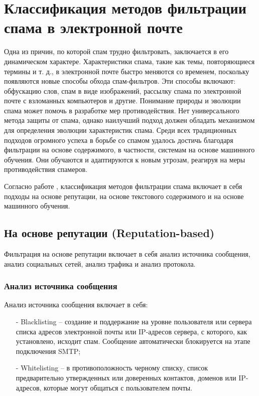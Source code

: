 \section{Классификация методов фильтрации спама в электронной почте}\label{Section:Filtering}

Одна из причин, по которой спам трудно фильтровать, заключается в
его динамическом характере. Характеристики спама, такие как темы,
повторяющиеся термины и т. д., в электронной почте быстро меняются
со временем, поскольку появляются новые способы обхода спам-фильтров.
Эти способы включают: обфускацию слов, спам в виде изображений,
рассылку спама по электронной почте с взломанных компьютеров и другие.
Понимание природы и эволюции спама может помочь в разработке мер
противодействия. Нет универсального метода защиты от спама, однако
наилучший подход должен обладать механизмом для определения эволюции
характеристик спама. Среди всех традиционных подходов огромного успеха
в борьбе со спамом удалось достичь благодаря фильтрации на основе
содержимого, в частности, системам на основе машинного обучения.
Они обучаются и адаптируются к новым угрозам, реагируя на меры
противодействия спамеров.

Согласно работе \cite{filters}, классификация методов фильтрации спама включает в себя подходы 
на основе репутации, на основе текстового содержимого и на основе машинного обучения.

\subsection{На основе репутации (Reputation-based)}

Фильтрация на основе репутации включает в себя анализ источника сообщения, анализ социальных сетей, 
анализ трафика и анализ протокола.

\subsubsection{Анализ источника сообщения}
    
    Анализ источника сообщения включает в себя:

    \begin{itemize}
        \item[-] Blacklisting -- создание и поддержание на уровне пользователя 
        или сервера списка адресов электронной почты или IP-адресов сервера, 
        с которого, как установлено, исходит спам. Сообщение автоматически 
        блокируется на этапе подключения SMTP;
        \item[-] Whitelisting -- в противоположность черному списку, список 
        предварительно утвержденных или доверенных контактов, доменов или 
        IP-адресов, которые могут общаться с пользователем почты.
    \end{itemize}


